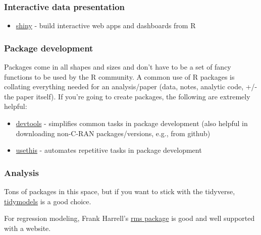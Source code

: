 \documentclass[
  letterpaper,
  DIV=11,
  numbers=noendperiod]{scrreprt}
\providecommand{\tightlist}{%
  \setlength{\itemsep}{0pt}\setlength{\parskip}{0pt}}\usepackage{longtable,booktabs,array}
\begin{document}
\hypertarget{interactive-data-presentation}{%
\subsubsection*{Interactive data
presentation}\label{interactive-data-presentation}}

\begin{itemize}
\tightlist
\item
  \href{https://shiny.rstudio.com/}{shiny} - build interactive web apps
  and dashboards from R
\end{itemize}

\hypertarget{package-development}{%
\subsubsection*{Package development}\label{package-development}}

Packages come in all shapes and sizes and don't have to be a set of
fancy functions to be used by the R community. A common use of R
packages is collating everything needed for an analysis/paper (data,
notes, analytic code, +/- the paper itself). If you're going to create
packages, the following are extremely helpful:

\begin{itemize}
\item
  \href{https://devtools.r-lib.org/}{devtools} - simplifies common tasks
  in package development (also helpful in downloading non-C-RAN
  packages/versions, e.g., from github)
\item
  \href{https://usethis.r-lib.org/}{usethis} - automates repetitive
  tasks in package development
\end{itemize}

\hypertarget{analysis}{%
\subsubsection*{Analysis}\label{analysis}}

Tons of packages in this space, but if you want to stick with the
tidyverse, \href{https://www.tidymodels.org/}{tidymodels} is a good
choice.

For regression modeling, Frank Harrell's
\href{https://hbiostat.org/R/rms/}{rms package} is good and well
supported with a website.
\end{document}
